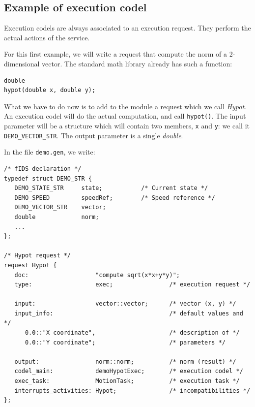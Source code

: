 \subsection{Example of execution codel}

Execution  codels are always associated  to   an execution request.  They
perform the actual actions of the service.

For this first example, we will write a request  that compute the norm of
a 2-dimensional vector. The standard math library already has such a
function:

\begin{center}\begin{cartouche}\small\begin{verbatim}
double
hypot(double x, double y);
\end{verbatim}\end{cartouche}\end{center}

What we have to do now  is to add  to the module  a request which we call
{\em Hypot}. An execution codel will do  the actual computation, and call
{\tt hypot()}. The input parameter will be a structure which will contain
two members, {\tt x} and {\tt y}: we call it {\tt DEMO\_VECTOR\_STR}. The
output parameter is a single {\em double}.

In the file {\tt demo.gen}, we write:

\begin{center}\begin{cartouche}\small\begin{verbatim}
/* fIDS declaration */
typedef struct DEMO_STR {
   DEMO_STATE_STR     state;           /* Current state */
   DEMO_SPEED         speedRef;        /* Speed reference */
   DEMO_VECTOR_STR    vector;
   double             norm;
   ...
};

/* Hypot request */
request Hypot {
   doc:                   "compute sqrt(x*x+y*y)";
   type:                  exec;                /* execution request */

   input:                 vector::vector;      /* vector (x, y) */
   input_info:                                 /* default values and */
      0.0::"X coordinate",                     /* description of */
      0.0::"Y coordinate";                     /* parameters */
   
   output:                norm::norm;          /* norm (result) */
   codel_main:            demoHypotExec;       /* execution codel */
   exec_task:             MotionTask;          /* execution task */
   interrupts_activities: Hypot;               /* incompatibilities */
};
\end{verbatim}\end{cartouche}\end{center}

